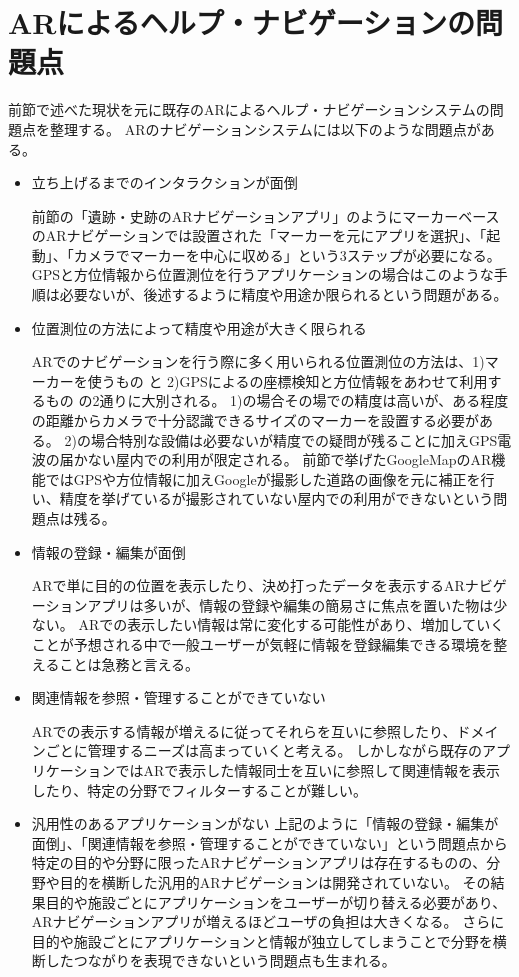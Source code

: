 \section{ARによるヘルプ・ナビゲーションの問題点}
\label{problems}
前節で述べた現状を元に既存のARによるヘルプ・ナビゲーションシステムの問題点を整理する。
ARのナビゲーションシステムには以下のような問題点がある。

\begin{itemize}
  \item 立ち上げるまでのインタラクションが面倒
  
  前節の「遺跡・史跡のARナビゲーションアプリ」のようにマーカーベースのARナビゲーションでは設置された「マーカーを元にアプリを選択」、「起動」、「カメラでマーカーを中心に収める」という3ステップが必要になる。
  GPSと方位情報から位置測位を行うアプリケーションの場合はこのような手順は必要ないが、後述するように精度や用途か限られるという問題がある。
  
  \item 位置測位の方法によって精度や用途が大きく限られる
  
  ARでのナビゲーションを行う際に多く用いられる位置測位の方法は、1)マーカーを使うもの と 2)GPSによるの座標検知と方位情報をあわせて利用するもの の2通りに大別される。
  1)の場合その場での精度は高いが、ある程度の距離からカメラで十分認識できるサイズのマーカーを設置する必要がある。
  2)の場合特別な設備は必要ないが精度での疑問が残ることに加えGPS電波の届かない屋内での利用が限定される。
  前節で挙げたGoogleMapのAR機能ではGPSや方位情報に加えGoogleが撮影した道路の画像を元に補正を行い、精度を挙げているが撮影されていない屋内での利用ができないという問題点は残る。

  \item 情報の登録・編集が面倒
  
  ARで単に目的の位置を表示したり、決め打ったデータを表示するARナビゲーションアプリは多いが、情報の登録や編集の簡易さに焦点を置いた物は少ない。
  ARでの表示したい情報は常に変化する可能性があり、増加していくことが予想される中で一般ユーザーが気軽に情報を登録編集できる環境を整えることは急務と言える。

  \item 関連情報を参照・管理することができていない
  
  ARでの表示する情報が増えるに従ってそれらを互いに参照したり、ドメインごとに管理するニーズは高まっていくと考える。
  しかしながら既存のアプリケーションではARで表示した情報同士を互いに参照して関連情報を表示したり、特定の分野でフィルターすることが難しい。

  \item 汎用性のあるアプリケーションがない
  上記のように「情報の登録・編集が面倒」、「関連情報を参照・管理することができていない」という問題点から特定の目的や分野に限ったARナビゲーションアプリは存在するものの、分野や目的を横断した汎用的ARナビゲーションは開発されていない。
  その結果目的や施設ごとにアプリケーションをユーザーが切り替える必要があり、ARナビゲーションアプリが増えるほどユーザの負担は大きくなる。
  さらに目的や施設ごとにアプリケーションと情報が独立してしまうことで分野を横断したつながりを表現できないという問題点も生まれる。

\end{itemize}



